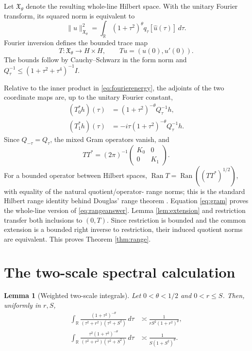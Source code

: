 \documentclass[11pt]{article}
\newtheorem{lemma}{Lemma}
\theoremstyle{remark}
\newcommand{\R}{\mathbb R}
\newcommand{\Ran}{\operatorname{Ran}}
\newcommand{\asympC}{\mathrel{\asymp}}
\begin{document}
Let $\mathfrak X_\theta$ denote the resulting whole-line Hilbert space.  With
the unitary Fourier transform, its squared norm is equivalent to
\begin{equation}\label{eq:fourierenergy}
 \|u\|_{\mathfrak X_\theta}^2
 =\int_{\R}(1+\tau^2)^\theta
 q_\tau[\widehat u(\tau)]\,d\tau.
\end{equation}
Fourier inversion defines the bounded trace map
\[
 T:\mathfrak X_\theta\longrightarrow H\times H,
 \qquad Tu=(u(0),u'(0)).
\]
The bounds follow by Cauchy--Schwarz in the form norm and
$Q_\tau^{-1}\le(1+\tau^2+\tau^4)^{-1}I$.

Relative to the inner product in \eqref{eq:fourierenergy}, the adjoints of
the two coordinate maps are, up to the unitary Fourier constant,
\begin{align*}
 (T_0^*h)(\tau)&=(1+\tau^2)^{-\theta}Q_\tau^{-1}h,\\
 (T_1^*h)(\tau)&=-i\tau(1+\tau^2)^{-\theta}Q_\tau^{-1}h.
\end{align*}
Since $Q_{-\tau}=Q_\tau$, the mixed Gram operators vanish, and
\begin{equation}\label{eq:gram}
 TT^*=(2\pi)^{-1}
 \begin{pmatrix}K_0&0\\0&K_1\end{pmatrix}.
\end{equation}
For a bounded operator between Hilbert spaces,
$\Ran T=\Ran((TT^*)^{1/2})$, with equality of the natural quotient/operator-
range norms; this is the standard Hilbert range identity behind Douglas'
range theorem \cite{Douglas}.  Equation \eqref{eq:gram} proves the whole-line
version of \eqref{eq:rangeanswer}.  Lemma \ref{lem:extension} and restriction
transfer both inclusions to $(0,T)$.  Since restriction is bounded and the
common extension is a bounded right inverse to restriction, their induced
quotient norms are equivalent.  This proves Theorem \ref{thm:range}.

\section{The two-scale spectral calculation}

\begin{lemma}[Weighted two-scale integrals]\label{lem:twoscale}
Let $0<\theta<1/2$ and $0<r\le S$.  Then, uniformly in $r,S$,
\begin{align}
 \int_{\R}\frac{(1+\tau^2)^{-\theta}}
 {(\tau^2+r^2)(\tau^2+S^2)}\,d\tau
 &\asympC\frac1{rS^2(1+r^2)^\theta},\label{eq:J0}\\
 \int_{\R}\frac{\tau^2(1+\tau^2)^{-\theta}}
 {(\tau^2+r^2)(\tau^2+S^2)}\,d\tau
 &\asympC\frac1{S(1+S^2)^\theta}.\label{eq:J1}
\end{align}
\end{lemma}
\end{document}

